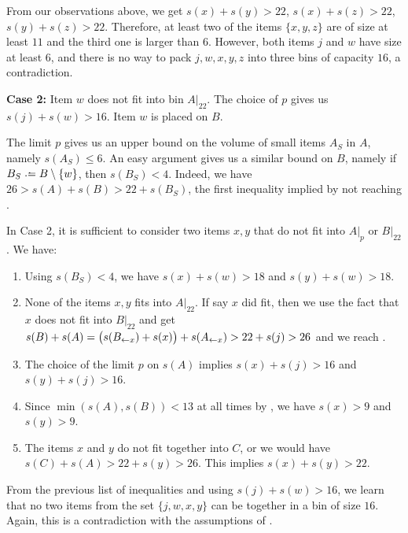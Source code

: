 From our observations above, we get $s(x) + s(y) > 22$, $s(x) + s(z) >
22$, $s(y) + s(z) > 22$. Therefore, at least two of the items
$\{x,y,z\}$ are of size at least $11$ and the third one is larger than 6.
However, both items $j$ and $w$ have size at least $6$,
and there is no way to pack $j,w,x,y,z$ into three bins of capacity $16$, a contradiction.

\smallskip
\noindent \textbf{Case 2:} Item $w$ does not fit into bin $A|_{22}$. The choice
of $p$ gives us $s(j)+s(w)>16$. Item $w$ is placed on $B$.

The limit $p$ gives us an upper bound on the volume of small items
$A_S$ in $A$, namely $s(A_S) \le 6$.  An easy argument gives us a similar bound on $B$,
namely if $B_S \defeq B \setminus \{w\}$, then $s(B_S) < 4$. Indeed, we have
$26 > s(A) + s(B) > 22 + s(B_S)$, the first inequality implied by not
reaching .

In Case 2, it is sufficient to consider two items $x,y$ that do not
fit into $A|_{p}$ or $B|_{22}$. We have:

\begin{enumerate}
\item Using $s(B_S)<4$, we have $s(x) + s(w) > 18$ and $s(y) + s(w) > 18$.
\item None of the items $x,y$ fits into $A|_{22}$. If say $x$ did fit, then we
use the fact that $x$ does not fit into $B|_{22}$ and get
$s(B) + s(A) = \big(s(B_{\leftarrow x}) + s(x)\big) + s(A_{\leftarrow x}) > 22 + s(j) > 26$ and we reach .
\item The choice of the limit $p$ on $s(A)$ implies $s(x) + s(j) > 16$ and $s(y) + s(j) > 16$.
\item Since $\min(s(A),s(B)) < 13$ at all times by , we have $s(x)>9$ and $s(y) > 9$.
\item The items $x$ and $y$ do not fit together into $C$, or we would have
$s(C) + s(A) > 22 + s(y) > 26$.  This implies $s(x) + s(y) > 22$.

\end{enumerate}

From the previous list of inequalities and using $s(j) + s(w) > 16$,
we learn that no two items from the set $\{j,w,x,y\}$ can be together
in a bin of size $16$. Again, this is a contradiction with the
assumptions of \binstretch.